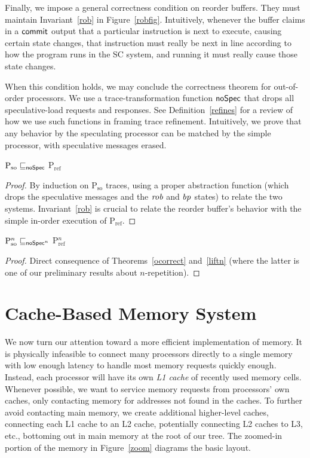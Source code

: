 Finally, we impose a general correctness condition on reorder
buffers.  They must maintain Invariant~\ref{rob} in Figure~\ref{robfig}.
Intuitively, whenever the buffer claims in a $\mathsf{commit}$
output that a particular instruction is next to execute, causing
certain state changes, that instruction must really be next in line according
to how the program runs in the SC system, and running it must really cause
those state changes.

When this condition holds, we may conclude the correctness theorem for
out-of-order processors.  We use a trace-transformation function
$\mathsf{noSpec}$ that drops all speculative-load requests and responses.
See Definition~\ref{refines} for a review of how we use such
functions in framing trace refinement.  Intuitively, we prove that any
behavior by the speculating processor can be matched by the simple
processor, with speculative messages erased.

\begin{theorem}
\label{ocorrect}
$\text{P$_\text{so}$} \sqsubseteq_{\mathsf{noSpec}}$ P$_\text{ref}$
\end{theorem}
\begin{proof}
By induction on P$_\text{so}$ traces, using a proper abstraction
function (which drops the speculative messages and the $\mathit{rob}$ and $\mathit{bp}$ states) to relate the two systems.  Invariant~\ref{rob} is crucial to
relate the reorder buffer's behavior with the simple in-order
execution of P$_\text{ref}$.
\end{proof}

\begin{corollary}
\label{ges}
$\text{P$^n_\text{so}$} \sqsubseteq_{\mathsf{noSpec}^n}$ P$_\text{ref}^n$
\end{corollary}
\begin{proof}
Direct consequence of Theorems~\ref{ocorrect} and~\ref{liftn} (where the
latter is one of our preliminary results about $n$-repetition).
\end{proof}


\section{Cache-Based Memory System}\label{sec:cc}

We now turn our attention toward a more efficient implementation of
memory.  It is physically infeasible to connect many processors
directly to a single memory with low enough latency to handle most
memory requests quickly enough.  Instead, each processor will have its
own \emph{L1 cache} of recently used memory cells.  Whenever possible, we
want to service memory requests from processors' own caches, only
contacting memory for addresses not found in the caches.  To further
avoid contacting main memory, we create additional higher-level
caches, connecting each L1 cache to an L2 cache, potentially
connecting L2 caches to L3, etc., bottoming out in main memory at the
root of our tree. The zoomed-in portion of the memory in Figure~\ref{zoom}
diagrams the basic layout.

